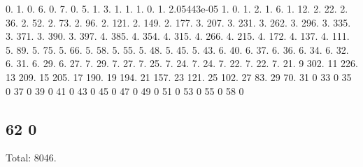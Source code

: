 0. 1. 0. 6. 0. 7. 0. 5. 1. 3. 1. 1. 1. 0. 1. 2.\+05443e-\/05 1. 0. 1. 2. 1. 6. 1. 12. 2. 22. 2. 36. 2. 52. 2. 73. 2. 96. 2. 121. 2. 149. 2. 177. 3. 207. 3. 231. 3. 262. 3. 296. 3. 335. 3. 371. 3. 390. 3. 397. 4. 385. 4. 354. 4. 315. 4. 266. 4. 215. 4. 172. 4. 137. 4. 111. 5. 89. 5. 75. 5. 66. 5. 58. 5. 55. 5. 48. 5. 45. 5. 43. 6. 40. 6. 37. 6. 36. 6. 34. 6. 32. 6. 31. 6. 29. 6. 27. 7. 29. 7. 27. 7. 25. 7. 24. 7. 24. 7. 22. 7. 22. 7. 21. 9 302. 11 226. 13 209. 15 205. 17 190. 19 194. 21 157. 23 121. 25 102. 27 83. 29 70. 31 0 33 0 35 0 37 0 39 0 41 0 43 0 45 0 47 0 49 0 51 0 53 0 55 0 58 0 \subsection*{62 0 }

Total\+: 8046. 